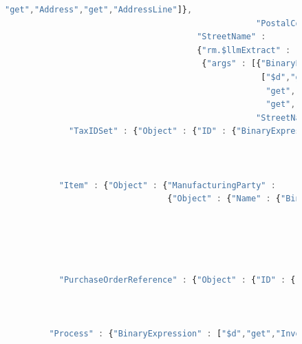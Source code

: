 \documentclass[10pt,letterpaper]{article} %
\providecommand{\DIFmodend}{} %
\begin{document}
\begin{figure}[H]
\begin{lstlisting}[language=JavaScript,basicstyle=\ttfamily\scriptsize,numberstyle=\scriptsize,alsolanguage=DIFcode]
                                                     "get","Address","get","AddressLine"]},
                                                   "PostalCode"]}},
                                       "StreetName" :
                                       {"rm.$llmExtract" :
                                        {"args" : [{"BinaryExpression" :
                                                    ["$d","get","Invoice","get","DataArea","get","Invoice",
                                                     "get","InvoiceLine","get","BuyerParty","get","Location",
                                                     "get","Address","get","AddressLine"]},
                                                   "StreetName"]}}}}}},
             "TaxIDSet" : {"Object" : {"ID" : {"BinaryExpression" : ["$d","get","Invoice","get","DataArea",
                                                                     "get","Invoice","get","InvoiceLine",
                                                                     "get","BuyerParty",
                                                                     "get","TaxIDSet","get","ID"]}}}}},
           "Item" : {"Object" : {"ManufacturingParty" :
                                 {"Object" : {"Name" : {"BinaryExpression" : ["$d","get","Invoice",
                                                                              "get","DataArea",
                                                                              "get","Invoice","get","InvoiceLine",
                                                                              "get","Item",
                                                                              "get","ManufacturingParty",
                                                                              "get","Name"]}}}}},
           "PurchaseOrderReference" : {"Object" : {"ID" : {"BinaryExpression" :
                                                           ["$d","get","Invoice","get","DataArea","get","Invoice",
                                                            "get","InvoiceHeader","get","PurchaseOrderReference",
                                                            "get","ID"]}}}}},
         "Process" : {"BinaryExpression" : ["$d","get","Invoice","get","DataArea","get","Process"]}}}}}}}}}}
\end{lstlisting}
\DIFmodend
\end{figure}  \vspace{-3em}

 \appendix
 \pagebreak

 \renewcommand{\thesection}{Appendix \Alph{section}} %
\end{document}
